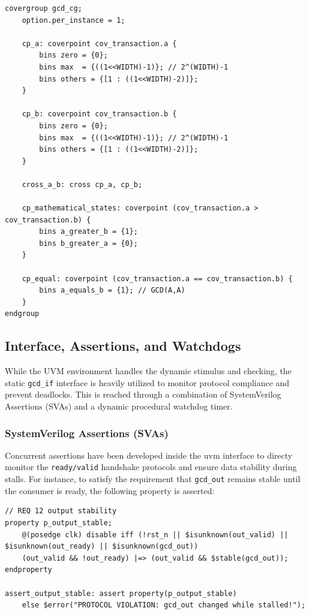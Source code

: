 \begin{verbatim}
covergroup gcd_cg;
    option.per_instance = 1;

    cp_a: coverpoint cov_transaction.a {
        bins zero = {0};
        bins max  = {((1<<WIDTH)-1)}; // 2^(WIDTH)-1
        bins others = {[1 : ((1<<WIDTH)-2)]};
    }

    cp_b: coverpoint cov_transaction.b {
        bins zero = {0};
        bins max  = {((1<<WIDTH)-1)}; // 2^(WIDTH)-1
        bins others = {[1 : ((1<<WIDTH)-2)]};
    }

    cross_a_b: cross cp_a, cp_b;

    cp_mathematical_states: coverpoint (cov_transaction.a > cov_transaction.b) {
        bins a_greater_b = {1};
        bins b_greater_a = {0}; 
    }

    cp_equal: coverpoint (cov_transaction.a == cov_transaction.b) {
        bins a_equals_b = {1}; // GCD(A,A)
    }
endgroup
\end{verbatim}

\subsection{Interface, Assertions, and Watchdogs}
While the UVM environment handles the dynamic stimulus and checking, the static \texttt{gcd\_if} interface is heavily utilized to monitor protocol compliance and prevent deadlocks. This is reached through a combination of SystemVerilog Assertions (SVAs) and a dynamic procedural watchdog timer.

\subsubsection{SystemVerilog Assertions (SVAs)}
Concurrent assertions have been developed inside the uvm interface to directy monitor the \texttt{ready/valid} handshake protocols and ensure data stability during stalls. For instance, to satisfy the requirement that \texttt{gcd\_out} remains stable until the consumer is ready, the following property is asserted:

\newpage
\begin{verbatim}
// REQ 12 output stability
property p_output_stable;
    @(posedge clk) disable iff (!rst_n || $isunknown(out_valid) || $isunknown(out_ready) || $isunknown(gcd_out))
    (out_valid && !out_ready) |=> (out_valid && $stable(gcd_out));
endproperty

assert_output_stable: assert property(p_output_stable)
    else $error("PROTOCOL VIOLATION: gcd_out changed while stalled!");
\end{verbatim}

